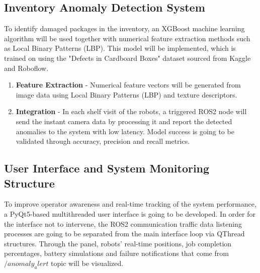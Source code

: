 \documentclass[conference]{IEEEtran}
\begin{document}
\subsection{Inventory Anomaly Detection System} 

To identify damaged packages in the inventory, an XGBoost machine learning algorithm will be used together with numerical feature extraction methods such as Local Binary Patterns (LBP). This model will be implemented, which is trained on using the "Defects in Cardboard Boxes" dataset sourced from Kaggle and Roboflow\cite{sarbeswar2024cardboarddefects}\cite{defects-1gsgd_dataset}.

\begin{enumerate}

    \item \textbf{Feature Extraction} - Numerical feature vectors will be generated from image data using Local Binary Patterns (LBP) and texture descriptors.

    \item \textbf{Integration} - In each shelf visit of the robots, a triggered ROS2 node will send the instant camera data by processing it and report the detected anomalies to the system with low latency. Model success is going to be validated through accuracy, precision and recall metrics. 

\end{enumerate}

\subsection{User Interface and System Monitoring Structure}

To improve operator awareness and real-time tracking of the system performance, a PyQt5-based multithreaded user interface is going to be developed. In order for the interface not to intervene, the ROS2 communication traffic data listening processes are going to be separated from the main interface loop via QThread structures. Through the panel, robots' real-time positions, job completion percentages, battery simulations and failure notifications that come from $/anomaly_alert$ topic will be visualized.

\vspace{10pt}
\end{document}
